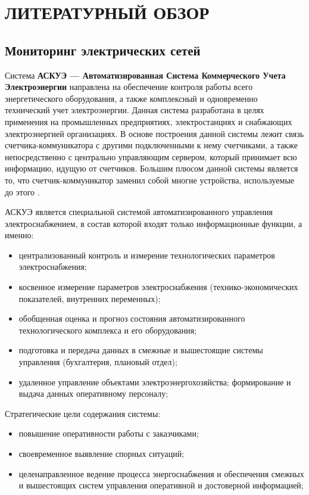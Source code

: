 \chapter{ЛИТЕРАТУРНЫЙ ОБЗОР}

\section{Мониторинг электрических сетей}

Система \textbf{АСКУЭ --- Автоматизированная Система Коммерческого Учета Электроэнергии} направлена на обеспечение контроля работы всего энергетического оборудования, а также комплексный и одновременно технический учет электроэнергии. Данная система разработана в целях применения на промышленных предприятиях, электростанциях и снабжающих электроэнергией организациях. В основе построения данной системы лежит связь счетчика-коммуникатора с другими подключенными к нему счетчиками, а также непосредственно с центрально управляющим сервером, который принимает всю информацию, идущую от счетчиков. Большим плюсом данной системы является то, что счетчик-коммуникатор заменил собой многие устройства, используемые до этого \cite{ascaepinfo}.

АСКУЭ является специальной системой автоматизированного управления электроснабжением, в состав которой входят только информационные функции, а именно:
\begin{itemize}
\item централизованный контроль и измерение технологических параметров электроснабжения;
\item косвенное измерение параметров электроснабжения (технико-экономических показателей, внутренних переменных);
\item обобщенная оценка и прогноз состояния автоматизированного технологического комплекса и его оборудования;
\item подготовка и передача данных в смежные и вышестоящие системы управления (бухгалтерия, плановый отдел);
\item удаленное управление объектами электроэнергохозяйства; формирование и выдача
данных оперативному персоналу;
\end{itemize}

Стратегические цели содержания системы:
\begin{itemize}
\item повышение оперативности работы с заказчиками;
\item своевременное выявление спорных ситуаций;
\item целенаправленное ведение процесса энергоснабжения и обеспечения смежных и вышестоящих систем управления оперативной и достоверной информацией;
\end{itemize}

